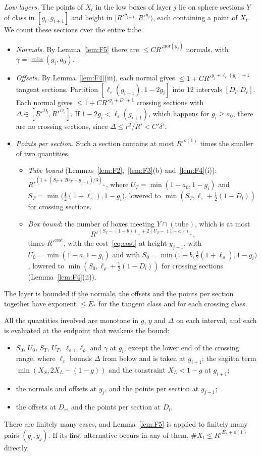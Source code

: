 \documentclass[aps,prx,twocolumn,superscriptaddress,nofootinbib,longbibliography]{revtex4-2}
\theoremstyle{plain}
\theoremstyle{definition}
\theoremstyle{remark}
\begin{document}
\emph{Low layers.} The points of $X_t$ in the low boxes of layer $j$ lie on sphere sections $Y$ of class in $[g_i,g_{i+1}]$ and height in $[R'^{y_{j-1}},R'^{y_j})$, each containing a point of $X_t$. We count these sections over the entire tube.
\begin{itemize}\setlength\itemsep{0pt}
\item \emph{Normals.} By Lemma~\ref{lem:F5} there are $\le CR'^{\mathrm{nor}(y_j)}$ normals, with $\gamma=\min(g_i,a_0)$.
\item \emph{Offsets.} By Lemma~\ref{lem:F4}(iii), each normal gives $\le1+CR'^{y_j+\ell_\varepsilon(g_i)+1}$ tangent sections. Partition $[\ell_\varepsilon(g_{i+1}),1-2g_i]$ into $12$ intervals $[D_l,D_r]$. Each normal gives $\le1+CR'^{y_j+D_r+1}$ crossing sections with $\Delta\in[R'^{D_l},R'^{D_r}]$. If $1-2g_i<\ell_\varepsilon(g_{i+1})$, which happens for $g_i\ge a_0$, there are no crossing sections, since $\Delta\le r^2/R'<C'\delta'$.
\item \emph{Points per section.} Such a section contains at most $R'^{o(1)}$ times the smaller of two quantities.
\begin{itemize}\setlength\itemsep{0pt}
\item \emph{Tube bound} (Lemmas~\ref{lem:F2},~\ref{lem:F3}(b) and~\ref{lem:F4}(i)): $R'^{(1+(S_T+2U_T-y_{j-1})/3)_+}$, where $U_T=\min(1-a_0,1-g_i)$ and $S_T=\min\big(\tfrac12(1+\ell_\varepsilon),1-g_i\big)$, lowered to $\min(S_T,\ell_\varepsilon+\tfrac12(1-D_l))$ for crossing sections.
\item \emph{Box bound}: the number of boxes meeting $Y\cap(\text{tube})$, which is at most
\[R'^{(S_T-(1-b))_++2(U_T-(1-a))_+},\]
times $R'^{\mathrm{cost}}$, with the cost~\eqref{eq:cost} at height $y_{j-1}$, with $U_0=\min(1-a,1-g_i)$ and with $S_0=\min\big(1-b,\tfrac12(1+\ell_\rho),1-g_i\big)$, lowered to $\min(S_0,\ell_\rho+\tfrac12(1-D_l))$ for crossing sections (Lemma~\ref{lem:F4}(ii)).
\end{itemize}
\end{itemize}
The layer is bounded if the normals, the offsets and the points per section together have exponent $\le E_*$ for the tangent class and for each crossing class.

All the quantities involved are monotone in $g$, $y$ and $\Delta$ on each interval, and each is evaluated at the endpoint that weakens the bound:
\begin{itemize}\setlength\itemsep{0pt}
\item $S_0$, $U_0$, $S_T$, $U_T$, $\ell_\varepsilon$, $\ell_\rho$ and $\gamma$ at $g_i$, except the lower end of the crossing range, where $\ell_\varepsilon$ bounds $\Delta$ from below and is taken at $g_{i+1}$; the sagitta term $\min(X_S,2X_L-(1-g))$ and the constraint $X_L<1-g$ at $g_{i+1}$;
\item the normals and offsets at $y_j$, and the points per section at $y_{j-1}$;
\item the offsets at $D_r$, and the points per section at $D_l$.
\end{itemize}
There are finitely many cases, and Lemma~\ref{lem:F5} is applied to finitely many pairs $(g_i,y_j)$. If its first alternative occurs in any of them, $\#X_t\le R'^{E_*+o(1)}$ directly.
\end{document}
